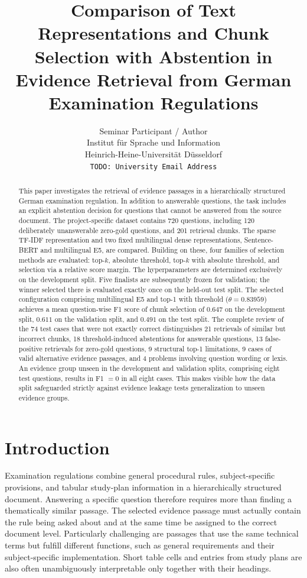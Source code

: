 \documentclass[11pt]{article}
\title{Comparison of Text Representations and Chunk Selection with Abstention in Evidence Retrieval from German Examination Regulations}
\author{Seminar Participant / Author \\
  Institut für Sprache und Information \\
  Heinrich-Heine-Universität Düsseldorf \\
  \texttt{TODO: University Email Address}}
\begin{document}
\maketitle

\begin{abstract}
This paper investigates the retrieval of evidence passages in a hierarchically structured German examination regulation. In addition to answerable questions, the task includes an explicit abstention decision for questions that cannot be answered from the source document. The project-specific dataset contains 720 questions, including 120 deliberately unanswerable zero-gold questions, and 201 retrieval chunks. The sparse TF-IDF representation and two fixed multilingual dense representations, Sentence-BERT and multilingual E5, are compared. Building on these, four families of selection methods are evaluated: top-$k$, absolute threshold, top-$k$ with absolute threshold, and selection via a relative score margin. The hyperparameters are determined exclusively on the development split. Five finalists are subsequently frozen for validation; the winner selected there is evaluated exactly once on the held-out test split. The selected configuration comprising multilingual E5 and top-1 with threshold ($\theta=0.83959$) achieves a mean question-wise F1 score of chunk selection of $0.647$ on the development split, $0.611$ on the validation split, and $0.491$ on the test split. The complete review of the 74 test cases that were not exactly correct distinguishes 21 retrievals of similar but incorrect chunks, 18 threshold-induced abstentions for answerable questions, 13 false-positive retrievals for zero-gold questions, 9 structural top-1 limitations, 9 cases of valid alternative evidence passages, and 4 problems involving question wording or lexis. An evidence group unseen in the development and validation splits, comprising eight test questions, results in F1 $=0$ in all eight cases. This makes visible how the data split safeguarded strictly against evidence leakage tests generalization to unseen evidence groups.
\end{abstract}


\section{Introduction}

Examination regulations combine general procedural rules, subject-specific provisions, and tabular study-plan information in a hierarchically structured document. Answering a specific question therefore requires more than finding a thematically similar passage. The selected evidence passage must actually contain the rule being asked about and at the same time be assigned to the correct document level. Particularly challenging are passages that use the same technical terms but fulfill different functions, such as general requirements and their subject-specific implementation. Short table cells and entries from study plans are also often unambiguously interpretable only together with their headings.
\end{document}
